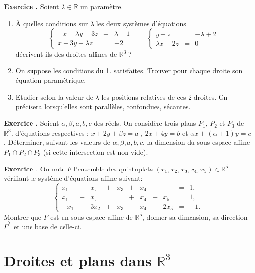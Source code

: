 \documentclass[10pt,a4paper]{article}
\def\bf#1{\textbf{#1}}
\newcounter{nexo}
\newcommand{\exo}{\medskip\noindent \bf{ Exercice \thenexo. \stepcounter{nexo}}}
\def\R{\mathbb{R}}
\def\vect#1{\overrightarrow{\kern-1pt#1\kern 2pt}}
\begin{document}
\medskip

\exo
Soient $\lambda\in \mathbb R$ un param\`etre. 
\begin{enumerate}
  \item \`A quelles conditions sur $\lambda$ les deux syst\`emes d'\'equations
 $$ \left\{
  \begin{array}{lll}
  -x+\lambda y-3z&=&\lambda-1\\
  x-3y+\lambda z&=&-2
  \end{array}\right.
  \qquad \left\{
  \begin{array}{lll}
  y+z&=&-\lambda+2\\
  \lambda x-2z&=&0
  \end{array}\right.
 $$
  d\'ecrivent-ils des droites affines de $\mathbb R^3$ ?
  \item On suppose les conditions du 1. satisfaites. Trouver pour chaque droite son \'equation param\'etrique. 
  \item Etudier selon la valeur de $\lambda$ les positions relatives de ces 2 droites. 
 On pr\'ecisera lorsqu'elles sont parall\`eles,  confondues, s\'ecantes.
\end{enumerate}

\medskip

\exo
Soient $\alpha,\beta,a,b,c$ des r\'eels. On consid\`ere trois plans $P_{1}$, $P_{2}$ et $P_{3}$ de $\mathbb R^3$, d'\'equations respectives :
$x+2y+\beta z=a$ , $2x+4y=b$ et $\alpha x+(\alpha+1)y=c$.
D\'eterminer, suivant les valeurs de $\alpha,\beta,a,b,c$, la dimension du
sous-espace affine $P_1\cap P_2\cap P_3$ (si cette intersection est
non vide). 

\medskip

\exo 
On note $F$ l'ensemble des quintuplets $(x_1,x_2,x_3,x_4,x_5)\in\R^5$ v\'erifiant le syst\`eme d'\'equations affine suivant:
$$
\left\{\begin{array}{lrlrlrlrlcl} 
x_1 &+& x_2 &+ & x_3 &+& x_4 & & &=& 1,\\
x_1 &-& x_2& & &+& x_4 &-& x_5 &=& 1 ,\\
-x_1 &+& 3x_2 &+& x_3 &-& x_4 &+& 2x_5 &=& -1.
\end{array}\right.
$$
Montrer que $F$ est un sous-espace affine de $\R^5$, donner sa dimension, sa direction $\vect{F}$ et une base de celle-ci.



\section{Droites et plans dans $\R^{3}$}
\end{document}

